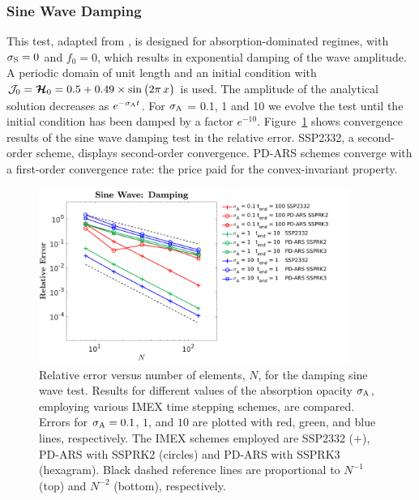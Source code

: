 \subsubsection{Sine Wave Damping}
This test, adapted from \cite{skinnerOstriker_2013}, is designed for absorption-dominated regimes, with $\sigma_{{\rm S}} = 0$ and $f_0 = 0$, which results in exponential damping of the wave amplitude.
A periodic domain of unit length and an initial condition with $\mathcal{J}_{0} = \boldsymbol{\mathcal{H}}_{0} = 0.5+0.49\times\sin\big(2\pi\,x\big)$ is used.
The amplitude of the analytical solution decreases as $e^{-\sigma_{{\rm A}} t}$.
For $\sigma_{{\rm A}}$ = 0.1, 1 and 10 we evolve the test until the initial condition has been damped by a factor $e^{-10}$. 
Figure~\ref{fig:SineWaveDamping} shows convergence results of the sine wave damping test in the relative error.
SSP2332, a second-order scheme, displays second-order convergence.
PD-ARS schemes converge with a first-order convergence rate: the price paid for the convex-invariant property.
\begin{figure}[h]
  \centering
    \includegraphics[width=0.9\textwidth]{figures/SineWaveDamping}
   \caption{Relative error versus number of elements, $N$, for the damping sine wave test. Results for different values of the absorption opacity $\sigma_{{\rm A}}$, employing various IMEX time stepping schemes, are compared.  Errors for $\sigma_{{\rm A}}=0.1$, $1$, and $10$ are plotted with red, green, and blue lines, respectively.  The IMEX schemes employed are SSP2332 ($+$), PD-ARS with SSPRK2 (circles) and PD-ARS with SSPRK3 (hexagram).  Black dashed reference lines are proportional to $N^{-1}$ (top) and $N^{-2}$ (bottom), respectively.}
  \label{fig:SineWaveDamping}
\end{figure}

